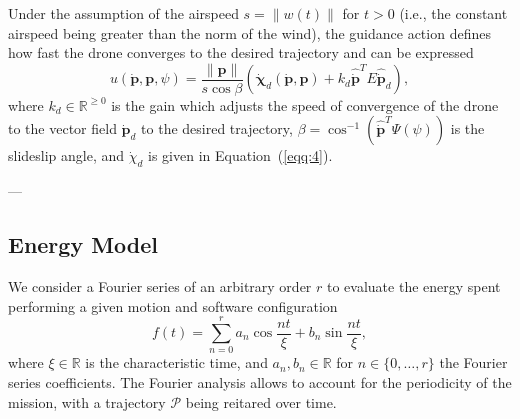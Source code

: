 \documentclass[letterpaper,10pt,conference]{ieeeconf}
\begin{document}
Under the assumption of the airspeed $s=\|w(t)\|$ for $t>0$ (i.e., the constant airspeed being greater than the norm of the wind), the guidance action defines how fast the drone converges to the desired trajectory and can be expressed
\begin{equation}
  u(\dot{\mathbf{p}},\mathbf{p},\psi)=\frac{\|\mathbf{p}\|}{s\cos{\beta}}\left( \dot{\mathbf{\chi}}_d(\dot{\mathbf{p}},\mathbf{p})+k_d\hat{\dot{\mathbf{p}}}^TE\hat{\dot{\mathbf{p}}}_d \right),
\end{equation} 
where $k_d\in\mathbb{R}^{\geq 0}$ is the gain which adjusts the speed of convergence of the drone to the vector field $\dot{\mathbf{p}}_d$ to the desired trajectory, $\beta=\cos^{-1}{\left( \hat{\dot{\mathbf{p}}}^T\Psi(\psi) \right)}$ is the slideslip angle, and $\dot{\chi}_d$ is given in Equation~(\ref{eqq:4}).

---

\subsection{Energy Model}

We consider a Fourier series of an arbitrary order $r$ to evaluate the energy spent performing a given motion and software configuration
\begin{equation}\label{eqq:6}
  f(t)=\sum_{n=0}^{r}{a_n\cos{\frac{nt}{\xi}}+b_n\sin{\frac{nt}{\xi}}},
\end{equation}
where $\xi\in\mathbb{R}$ is the characteristic time, and $a_n, b_n\in\mathbb{R}$ for $n\in\{0,\dotsc,r\}$ the Fourier series coefficients. The Fourier analysis allows to account for the periodicity of the mission, with a trajectory $\mathcal{P}$ being reitared over time. 
\end{document}

